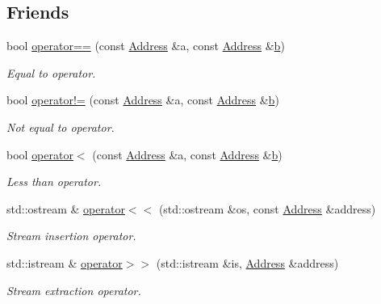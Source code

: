 \subsection*{Friends}
\begin{DoxyCompactItemize}
\item 
bool \hyperlink{classns3_1_1Address_af1156ccf63d6d73d4ca9ef2f83cf2852}{operator==} (const \hyperlink{classns3_1_1Address}{Address} \&a, const \hyperlink{classns3_1_1Address}{Address} \&\hyperlink{lte__pathloss_8m_a21ad0bd836b90d08f4cf640b4c298e7c}{b})
\begin{DoxyCompactList}\small\item\em Equal to operator. \end{DoxyCompactList}\item 
bool \hyperlink{classns3_1_1Address_aad2f6fc407c9313a235e482088b623c4}{operator!=} (const \hyperlink{classns3_1_1Address}{Address} \&a, const \hyperlink{classns3_1_1Address}{Address} \&\hyperlink{lte__pathloss_8m_a21ad0bd836b90d08f4cf640b4c298e7c}{b})
\begin{DoxyCompactList}\small\item\em Not equal to operator. \end{DoxyCompactList}\item 
bool \hyperlink{classns3_1_1Address_aeb33dc6d758de9e647cfd1f113998635}{operator$<$} (const \hyperlink{classns3_1_1Address}{Address} \&a, const \hyperlink{classns3_1_1Address}{Address} \&\hyperlink{lte__pathloss_8m_a21ad0bd836b90d08f4cf640b4c298e7c}{b})
\begin{DoxyCompactList}\small\item\em Less than operator. \end{DoxyCompactList}\item 
std\+::ostream \& \hyperlink{classns3_1_1Address_a125ef1d54e4d0f7175f399a28bedd675}{operator$<$$<$} (std\+::ostream \&os, const \hyperlink{classns3_1_1Address}{Address} \&address)
\begin{DoxyCompactList}\small\item\em Stream insertion operator. \end{DoxyCompactList}\item 
std\+::istream \& \hyperlink{classns3_1_1Address_a3522e6b3e8456ff242b212d18e2ba944}{operator$>$$>$} (std\+::istream \&is, \hyperlink{classns3_1_1Address}{Address} \&address)
\begin{DoxyCompactList}\small\item\em Stream extraction operator. \end{DoxyCompactList}\end{DoxyCompactItemize}


